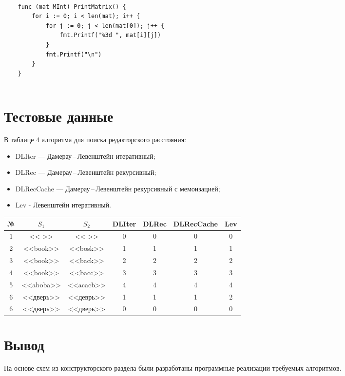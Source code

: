 \begin{lstlisting}[label=out-matrix,caption=Вывод матрицы расстояний]
	
	func (mat MInt) PrintMatrix() {
		for i := 0; i < len(mat); i++ {
			for j := 0; j < len(mat[0]); j++ {
				fmt.Printf("%3d ", mat[i][j])
			}
			fmt.Printf("\n")
		}
	}
	
\end{lstlisting}


\section{Тестовые данные}
В таблице 4 алгоритма для поиска редакторского расстояния: 

\begin{itemize}
	\item DLIter --- Дамерау\,--\,Левенштейн итеративный;
	\item DLRec --- Дамерау\,--\,Левенштейн рекурсивный;
	\item DLRecCache --- Дамерау\,--\,Левенштейн рекурсивный с мемоизацией;
	\item Lev - Левенштейн итеративный.
\end{itemize}

\begin{table}[ht!]
	\begin{center}
		
		\begin{tabular}{||c c c | c c c c||} 
			\hline
			№ & $S_1$ & $S_2$ & DLIter & DLRec & DLRecCache & Lev\\
			[0.5ex] 
			\hline\hline
			1 & << >> & << >> & 0 & 0 & 0 & 0 \\
			2 & <<book>> & <<bosk>> & 1 & 1 & 1 & 1 \\ 
			3 & <<book>> & <<back>> & 2 & 2 & 2 & 2 \\ 
			4 & <<book>> & <<bacc>> & 3 & 3 & 3 & 3 \\ 
			5 & <<aboba>> & <<acacb>> & 4 & 4 & 4 & 4 \\ 
			6 & <<дверь>> & <<деврь>> & 1 & 1 & 1 & 2 \\   
			6 & <<дверь>> & <<дверь>> & 0 & 0 & 0 & 0\\   
			\hline
		\end{tabular}
	\end{center}
\end{table}



\section{Вывод}
На основе схем из конструкторского раздела были разработаны программные реализации требуемых алгоритмов.